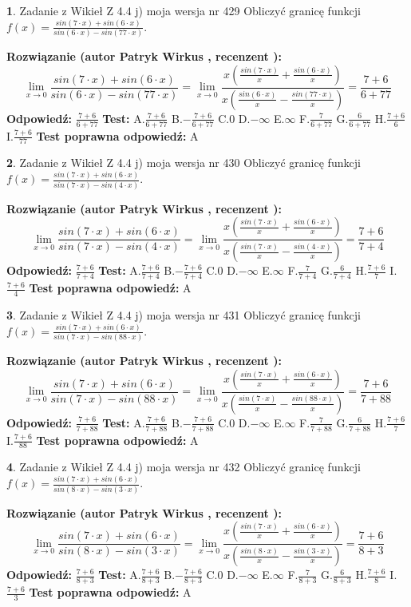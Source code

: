 \documentclass[12pt, a4paper]{article}
\theoremstyle{definition} %
\newtheorem{zad}{}
\newcommand{\zadStart}[1]{\begin{zad}#1\newline}
\newcommand{\zadStop}{\end{zad}}
\newcommand{\rozwStart}[2]{\noindent \textbf{Rozwiązanie (autor #1 , recenzent #2): }\newline}
\newcommand{\rozwStop}{\newline}
\newcommand{\odpStart}{\noindent \textbf{Odpowiedź:}\newline}
\newcommand{\odpStop}{\newline}
\newcommand{\testStart}{\noindent \textbf{Test:}\newline}
\newcommand{\testStop}{\newline}
\newcommand{\kluczStart}{\noindent \textbf{Test poprawna odpowiedź:}\newline}
\newcommand{\kluczStop}{\newline}
\begin{document}
\zadStart{Zadanie z Wikieł Z 4.4 j) moja wersja nr 429}
Obliczyć granicę funkcji $f(x)=\frac{sin(7\cdot x) +sin(6\cdot x)}{sin(6\cdot x) -sin(77\cdot x)}$.
\zadStop
\rozwStart{Patryk Wirkus}{}
$$\lim\limits_{x\to 0}\frac{sin(7\cdot x) +sin(6\cdot x)}{sin(6\cdot x) -sin(77\cdot x)}=\lim\limits_{x\to 0}\frac{x(\frac{sin(7\cdot x)}{x}+\frac{sin(6\cdot x)}{x})}{x(\frac{sin(6\cdot x)}{x}-\frac{sin(77\cdot x)}{x})}=\frac{7+6}{6+77}$$
\rozwStop
\odpStart
$\frac{7+6}{6+77}$
\odpStop
\testStart
A.$\frac{7+6}{6+77}$
B.$-\frac{7+6}{6+77}$
C.$0$
D.$-\infty$
E.$\infty$
F.$\frac{7}{6+77}$
G.$\frac{6}{6+77}$
H.$\frac{7+6}{6}$
I.$\frac{7+6}{77}$
\testStop
\kluczStart
A
\kluczStop



\zadStart{Zadanie z Wikieł Z 4.4 j) moja wersja nr 430}
Obliczyć granicę funkcji $f(x)=\frac{sin(7\cdot x) +sin(6\cdot x)}{sin(7\cdot x) -sin(4\cdot x)}$.
\zadStop
\rozwStart{Patryk Wirkus}{}
$$\lim\limits_{x\to 0}\frac{sin(7\cdot x) +sin(6\cdot x)}{sin(7\cdot x) -sin(4\cdot x)}=\lim\limits_{x\to 0}\frac{x(\frac{sin(7\cdot x)}{x}+\frac{sin(6\cdot x)}{x})}{x(\frac{sin(7\cdot x)}{x}-\frac{sin(4\cdot x)}{x})}=\frac{7+6}{7+4}$$
\rozwStop
\odpStart
$\frac{7+6}{7+4}$
\odpStop
\testStart
A.$\frac{7+6}{7+4}$
B.$-\frac{7+6}{7+4}$
C.$0$
D.$-\infty$
E.$\infty$
F.$\frac{7}{7+4}$
G.$\frac{6}{7+4}$
H.$\frac{7+6}{7}$
I.$\frac{7+6}{4}$
\testStop
\kluczStart
A
\kluczStop



\zadStart{Zadanie z Wikieł Z 4.4 j) moja wersja nr 431}
Obliczyć granicę funkcji $f(x)=\frac{sin(7\cdot x) +sin(6\cdot x)}{sin(7\cdot x) -sin(88\cdot x)}$.
\zadStop
\rozwStart{Patryk Wirkus}{}
$$\lim\limits_{x\to 0}\frac{sin(7\cdot x) +sin(6\cdot x)}{sin(7\cdot x) -sin(88\cdot x)}=\lim\limits_{x\to 0}\frac{x(\frac{sin(7\cdot x)}{x}+\frac{sin(6\cdot x)}{x})}{x(\frac{sin(7\cdot x)}{x}-\frac{sin(88\cdot x)}{x})}=\frac{7+6}{7+88}$$
\rozwStop
\odpStart
$\frac{7+6}{7+88}$
\odpStop
\testStart
A.$\frac{7+6}{7+88}$
B.$-\frac{7+6}{7+88}$
C.$0$
D.$-\infty$
E.$\infty$
F.$\frac{7}{7+88}$
G.$\frac{6}{7+88}$
H.$\frac{7+6}{7}$
I.$\frac{7+6}{88}$
\testStop
\kluczStart
A
\kluczStop



\zadStart{Zadanie z Wikieł Z 4.4 j) moja wersja nr 432}
Obliczyć granicę funkcji $f(x)=\frac{sin(7\cdot x) +sin(6\cdot x)}{sin(8\cdot x) -sin(3\cdot x)}$.
\zadStop
\rozwStart{Patryk Wirkus}{}
$$\lim\limits_{x\to 0}\frac{sin(7\cdot x) +sin(6\cdot x)}{sin(8\cdot x) -sin(3\cdot x)}=\lim\limits_{x\to 0}\frac{x(\frac{sin(7\cdot x)}{x}+\frac{sin(6\cdot x)}{x})}{x(\frac{sin(8\cdot x)}{x}-\frac{sin(3\cdot x)}{x})}=\frac{7+6}{8+3}$$
\rozwStop
\odpStart
$\frac{7+6}{8+3}$
\odpStop
\testStart
A.$\frac{7+6}{8+3}$
B.$-\frac{7+6}{8+3}$
C.$0$
D.$-\infty$
E.$\infty$
F.$\frac{7}{8+3}$
G.$\frac{6}{8+3}$
H.$\frac{7+6}{8}$
I.$\frac{7+6}{3}$
\testStop
\kluczStart
A
\kluczStop
\end{document}

